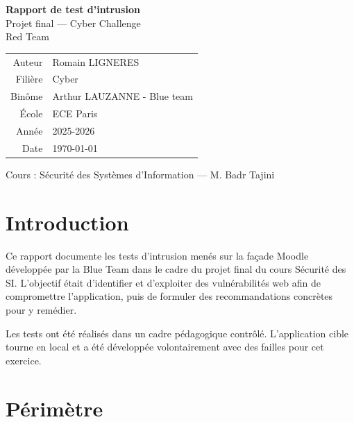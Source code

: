 \documentclass[a4paper,12pt]{article}
\begin{document}
\begin{titlepage}
\centering
\vspace*{4cm}

{\Large\bfseries Rapport de test d'intrusion}\\[0.4cm]
{\large Projet final — Cyber Challenge}\\[0.2cm]
{\normalsize\color{gris} Red Team}

\vspace{3cm}

\begin{tabular}{rl}
    Auteur      & Romain LIGNERES \\
    Filière     & Cyber \\
    Binôme      & Arthur LAUZANNE - Blue team \\
    École       & ECE Paris \\
    Année       & 2025-2026 \\
    Date        & \today \\
\end{tabular}

\vfill
{\small\color{gris} Cours : Sécurité des Systèmes d'Information — M. Badr Tajini}
\end{titlepage}

\tableofcontents
\newpage

\section{Introduction}

Ce rapport documente les tests d'intrusion menés sur la façade Moodle développée par la Blue Team
dans le cadre du projet final du cours Sécurité des SI. L'objectif était d'identifier et d'exploiter
des vulnérabilités web afin de compromettre l'application, puis de formuler des recommandations
concrètes pour y remédier.

Les tests ont été réalisés dans un cadre pédagogique contrôlé. L'application cible tourne en local
et a été développée volontairement avec des failles pour cet exercice.

\section{Périmètre}
\end{document}
